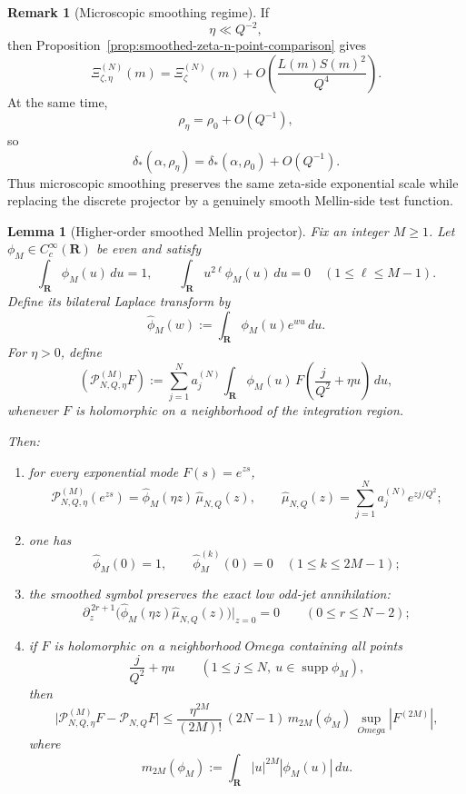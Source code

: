 \documentclass[11pt,a4paper]{amsart}
\def\Omega{Omega}%
\theoremstyle{plain}
\newtheorem{lemma}[theorem]{Lemma}
\theoremstyle{definition}
\newtheorem{remark}[theorem]{Remark}
\begin{document}
\begin{remark}[Microscopic smoothing regime]
\label{rem:microscopic-smoothing-zeta-n-point}
If
\[
\eta\ll Q^{-2},
\]
then Proposition~\ref{prop:smoothed-zeta-n-point-comparison} gives
\[
\Xi_{\zeta,\eta}^{(N)}(m)
=
\Xi_{\zeta}^{(N)}(m)
+
O\!\left(\frac{L(m)S(m)^2}{Q^4}\right).
\]
At the same time,
\[
\rho_\eta=\rho_0+O(Q^{-1}),
\]
so
\[
\delta_*(\alpha,\rho_\eta)
=
\delta_*(\alpha,\rho_0)+O(Q^{-1}).
\]
Thus microscopic smoothing preserves the same zeta-side exponential scale while
replacing the discrete projector by a genuinely smooth Mellin-side test
function.
\end{remark}

\begin{lemma}[Higher-order smoothed Mellin projector]
\label{lem:higher-order-smoothed-mellin-projector}
Fix an integer $M\ge 1$. Let $\phi_M\in C_c^\infty(\mathbf R)$ be even and
satisfy
\[
\int_{\mathbf R}\phi_M(u)\,du=1,
\qquad
\int_{\mathbf R}u^{2\ell}\phi_M(u)\,du=0
\quad (1\le \ell\le M-1).
\]
Define its bilateral Laplace transform by
\[
\widehat\phi_M(w):=\int_{\mathbf R}\phi_M(u)e^{wu}\,du.
\]
For $\eta>0$, define
\[
(\mathcal P_{N,Q,\eta}^{(M)}F)
:=
\sum_{j=1}^N a_j^{(N)}
\int_{\mathbf R}\phi_M(u)\,
F\!\left(\frac{j}{Q^2}+\eta u\right)\,du,
\]
whenever $F$ is holomorphic on a neighborhood of the integration region.

Then:

\begin{enumerate}
\item for every exponential mode $F(s)=e^{zs}$,
\[
\mathcal P_{N,Q,\eta}^{(M)}(e^{zs})
=
\widehat\phi_M(\eta z)\,\widehat\mu_{N,Q}(z),
\qquad
\widehat\mu_{N,Q}(z)=\sum_{j=1}^N a_j^{(N)}e^{zj/Q^2};
\]

\item one has
\[
\widehat\phi_M(0)=1,
\qquad
\widehat\phi_M^{(k)}(0)=0
\quad (1\le k\le 2M-1);
\]

\item the smoothed symbol preserves the exact low odd-jet annihilation:
\[
\partial_z^{\,2r+1}\!\bigl(\widehat\phi_M(\eta z)\widehat\mu_{N,Q}(z)\bigr)\Big|_{z=0}=0
\qquad (0\le r\le N-2);
\]

\item if $F$ is holomorphic on a neighborhood $\Omega$ containing all points
\[
\frac{j}{Q^2}+\eta u
\qquad
(1\le j\le N,\ u\in \operatorname{supp}\phi_M),
\]
then
\[
\bigl|\mathcal P_{N,Q,\eta}^{(M)}F-\mathcal P_{N,Q}F\bigr|
\le
\frac{\eta^{2M}}{(2M)!}\,(2N-1)\,m_{2M}(\phi_M)\,
\sup_{\Omega}|F^{(2M)}|,
\]
where
\[
m_{2M}(\phi_M):=\int_{\mathbf R}|u|^{2M}|\phi_M(u)|\,du.
\]
\end{enumerate}
\end{lemma}
\end{document}
